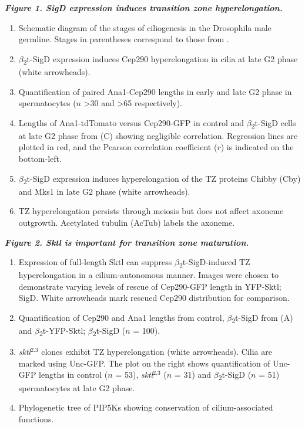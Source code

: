 \documentclass[12pt, twoside, letterpaper]{article}
\newcommand{\sigd}{$\beta$\textsubscript{2}t-SigD}
\begin{document}
\begin{doublespacing}
\begin{linenumbers}
    \textbf{\itshape Figure 1. SigD expression induces transition zone hyperelongation.}
    \begin{enumerate}[label={(\Alph*)}, nolistsep]
    \item Schematic diagram of the stages of ciliogenesis in the Drosophila male germline.
      Stages in parentheses correspond to those from \citep{cenci1994chromatin}.
    \item \sigd{} expression induces Cep290 hyperelongation in cilia at late G2 phase (white arrowheads).
    \item Quantification of paired Ana1-Cep290 lengths in early and late G2 phase in spermatocytes ($n$ >30 and >65 respectively).
    \item Lengths of Ana1-tdTomato versus Cep290-GFP in control and \sigd{} cells at late G2 phase from (C) showing negligible correlation.
      Regression lines are plotted in red, and the Pearson correlation coefficient ($r$) is indicated on the bottom-left.
    \item \sigd{} expression induces hyperelongation of the TZ proteins Chibby (Cby) and Mks1 in late G2 phase (white arrowheads).
    \item TZ hyperelongation persists through meiosis but does not affect
      axoneme outgrowth. Acetylated tubulin (AcTub) labels the axoneme.
    \end{enumerate}
    \bigskip
    \textbf{\itshape Figure 2. Sktl is important for transition zone maturation.}
    \begin{enumerate}[label={(\Alph*)}, nolistsep]
    \item Expression of full-length Sktl can suppress \sigd{}-induced TZ hyperelongation in a cilium-autonomous manner.
      Images were chosen to demonstrate varying levels of rescue of Cep290-GFP length in YFP-Sktl; SigD.
      White arrowheads mark rescued Cep290 distribution for comparison.
    \item Quantification of Cep290 and Ana1 lengths from control, \sigd{} from (A) and $\beta$\textsubscript{2}t-YFP-Sktl; \sigd{} ($n$ = 100).
    \item \textit{sktl}$^{2.3}$ clones exhibit TZ hyperelongation (white arrowheads). Cilia are marked using
      Unc-GFP. The plot on the right shows quantification of Unc-GFP lengths in control ($n$ = 53), \textit{sktl}$^{2.3}$ ($n$ = 31) and \sigd{}  ($n$ = 51)
      spermatocytes at late G2 phase.
    \item Phylogenetic tree of PIP5Ks showing conservation of cilium-associated functions.

\end{enumerate}
\end{linenumbers}
\end{doublespacing}
\end{document}

